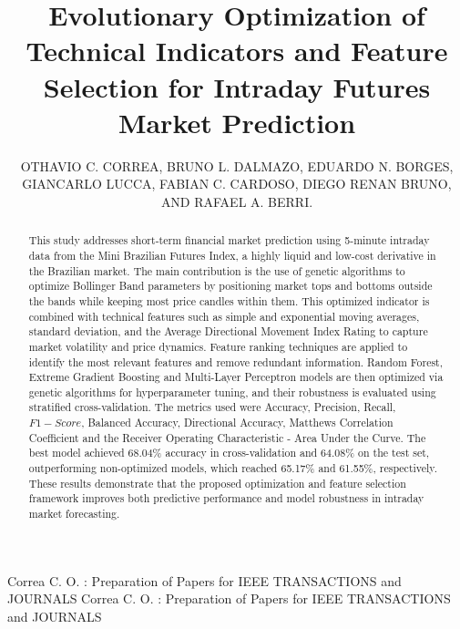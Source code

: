 \documentclass{ieeeaccess}
\begin{document}

\title{Evolutionary Optimization of Technical Indicators and Feature Selection for Intraday Futures Market Prediction}
\author{\uppercase{Othavio C. Correa}, 
\uppercase{Bruno L. Dalmazo},
\uppercase{Eduardo N. Borges},
\uppercase{Giancarlo Lucca},
\uppercase{Fabian C. Cardoso},
\uppercase{Diego Renan Bruno, and Rafael A. Berri}.}

\address[1]{Federal University of Rio Grande (FURG), Rio Grande, Brazil}
\address[2]{University of Rio Verde (UniRV), Rio Verde, Brazil}
\address[3]{São Paulo State University (UNESP), São José do Rio Preto, Brazil}



\markboth
{Correa C. O. \headeretal: Preparation of Papers for IEEE TRANSACTIONS and JOURNALS}
{Correa C. O. \headeretal: Preparation of Papers for IEEE TRANSACTIONS and JOURNALS}


\begin{abstract}
This study addresses short-term financial market prediction using 5-minute intraday data from the Mini Brazilian Futures Index, a highly liquid and low-cost derivative in the Brazilian market. The main contribution is the use of genetic algorithms to optimize Bollinger Band parameters by positioning market tops and bottoms outside the bands while keeping most price candles within them. This optimized indicator is combined with technical features such as simple and exponential moving averages, standard deviation, and the Average Directional Movement Index Rating to capture market volatility and price dynamics. Feature ranking techniques are applied to identify the most relevant features and remove redundant information. Random Forest, Extreme Gradient Boosting and Multi-Layer Perceptron models are then optimized via genetic algorithms for hyperparameter tuning, and their robustness is evaluated using stratified cross-validation. The metrics used were Accuracy, Precision, Recall, $F1-Score$, Balanced Accuracy, Directional Accuracy, Matthews Correlation Coefficient and the Receiver Operating Characteristic - Area Under the Curve. The best model achieved 68.04\% accuracy in cross-validation and 64.08\% on the test set, outperforming non-optimized models, which reached 65.17\% and 61.55\%, respectively. These results demonstrate that the proposed optimization and feature selection framework improves both predictive performance and model robustness in intraday market forecasting.
\end{abstract}
\end{document}
